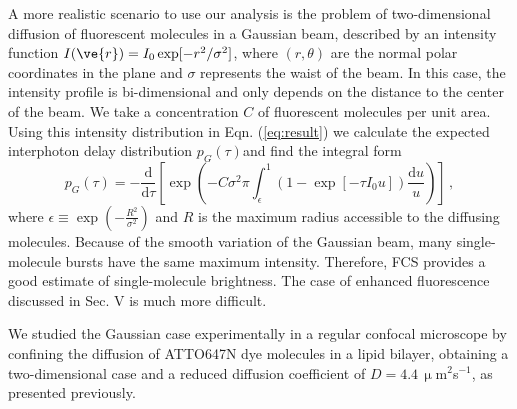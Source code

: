 A more realistic scenario to use our analysis is the problem of 
two-dimensional diffusion of fluorescent molecules in a Gaussian beam, 
described by an intensity function $I(\ve{r}) = I_0 \exp[-r^2/\sigma^2]$, 
where $(r,\theta)$ are the normal polar coordinates in the plane and 
$\sigma$ represents the waist of the beam.  
In this case, the intensity profile is bi-dimensional and only depends
on the distance to the center of the beam. We take a concentration 
$C$ of fluorescent molecules per unit area. Using this intensity 
distribution in Eqn. (\ref{eq:result}) we calculate the expected 
interphoton delay distribution $p_G(\tau)$and find the integral form
\begin{equation}
	p_{G}(\tau)=-\frac{\mbox{d}}{\mbox{d}\tau}
	\left[ \exp\left(-C \sigma^2 \pi \int_{\epsilon}^1\left(1-\exp\left[-\tau I_0 u \right]\right) 
	\frac{\mbox{d}u}{u}\right)    \right]\,,  
\label{eq:gaussian2d}
\end{equation}
where $\epsilon \equiv \exp\left(-\frac{R^2}{\sigma^2}\right)$ 
and $R$ is the maximum radius accessible to the diffusing molecules. Because of the smooth variation of the Gaussian beam, many single-molecule bursts have the same maximum intensity. Therefore, FCS  provides a good estimate of single-molecule brightness. The case of enhanced fluorescence discussed in Sec. V is much more difficult.

We studied the Gaussian case experimentally in a regular confocal microscope 
by confining the diffusion of ATTO647N dye molecules in a lipid bilayer, 
obtaining a two-dimensional case and a reduced diffusion coefficient of 
$D=4.4\, \upmu$m$^2$s$^{-1}$, as presented previously\cite{pradhan2016goldnanorodenhanced}. 

